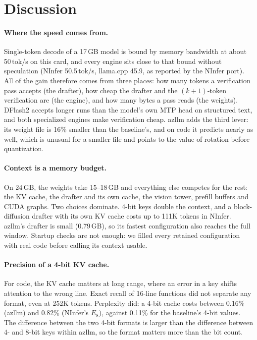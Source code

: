 \section{Discussion}
\label{sec:discussion}

\paragraph{Where the speed comes from.}
Single-token decode of a 17\,GB model is bound by memory bandwidth at about 50\,tok/s on this
card, and every engine sits close to that bound without speculation (NInfer 50.5\,tok/s,
llama.cpp 45.9, as reported by the NInfer port). All of the gain therefore comes from three
places: how many tokens a verification pass accepts (the drafter), how cheap the drafter and the
$(k{+}1)$-token verification are (the engine), and how many bytes a pass reads (the weights).
DFlash2 accepts longer runs than the model's own MTP head on structured text, and both
specialized engines make verification cheap. azllm adds the third lever: its weight file is
16\% smaller than the baseline's, and on code it predicts nearly as well, which is unusual for a
smaller file and points to the value of rotation before quantization.

\paragraph{Context is a memory budget.}
On 24\,GB, the weights take 15--18\,GB and everything else competes for the rest: the KV cache,
the drafter and its own cache, the vision tower, prefill buffers and CUDA graphs. Two choices
dominate. 4-bit keys double the context, and a block-diffusion drafter with its own KV cache
costs up to 111K tokens in NInfer. azllm's drafter is small (0.79\,GB), so its fastest
configuration also reaches the full window. Startup checks are not enough: we filled every
retained configuration with real code before calling its context usable.

\paragraph{Precision of a 4-bit KV cache.}
For code, the KV cache matters at long range, where an error in a key shifts attention to the
wrong line. Exact recall of 16-line functions did not separate any format, even at 252K tokens.
Perplexity did: a 4-bit cache costs between 0.16\% (azllm) and 0.82\% (NInfer's $E_8$), against
0.11\% for the baseline's 4-bit values. The difference between the two 4-bit formats is larger
than the difference between 4- and 8-bit keys within azllm, so the format matters more than the
bit count.

